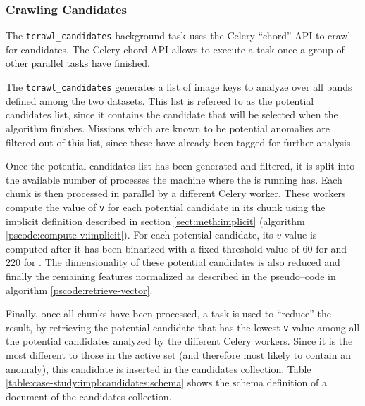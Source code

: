\subsubsection{Crawling Candidates} \label{subsubsect:case-study:impl:crawling-candidates}

The \texttt{tcrawl\_candidates} background task uses the Celery ``chord'' API to crawl for candidates. The Celery chord API allows to execute a task once a group of other parallel tasks have finished. \newline

The \texttt{tcrawl\_candidates} generates a list of image keys to analyze over all bands defined among the two datasets. This list is refereed to as the potential candidates list, since it contains the candidate that will be selected when the algorithm finishes. Missions which are known to be potential anomalies are filtered out of this list, since these have already been tagged for further analysis. \newline

Once the potential candidates list has been generated and filtered, it is split into the available number of processes the machine where the \mlblinkapi is running has. Each chunk is then processed in parallel by a different Celery worker. These workers compute the value of \texttt{v} for each potential candidate in its chunk using the implicit definition described in section \ref{sect:meth:implicit} (algorithm \ref{pscode:compute-v:implicit}). For each potential candidate, its $v$ value is computed after it has been binarized with a fixed threshold value of $60$ for \usno and $220$ for \panstarrs. The dimensionality of these potential candidates is also reduced and finally the remaining features normalized as described in the pseudo--code in algorithm \ref{pscode:retrieve-vector}. \newline

Finally, once all chunks have been processed, a task is used to ``reduce'' the result, by retrieving the potential candidate that has the lowest \texttt{v} value among all the potential candidates analyzed by the different Celery workers. Since it is the most different to those in the active set (and therefore most likely to contain an anomaly), this candidate is inserted in the candidates collection. Table \ref{table:case-study:impl:candidates:schema} shows the schema definition of a document of the candidates collection.

